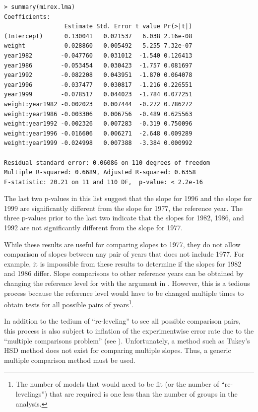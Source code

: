 \documentclass[10pt,openany]{book}\usepackage[]{graphicx}\usepackage[]{color}
\makeatletter
\newenvironment{kframe}{%
 \def\at@end@of@kframe{}%
 \ifinner\ifhmode%
  \def\at@end@of@kframe{\end{minipage}}%
  \begin{minipage}{\columnwidth}%
 \fi\fi%
 \def\FrameCommand##1{\hskip\@totalleftmargin \hskip-\fboxsep
 \colorbox{shadecolor}{##1}\hskip-\fboxsep
     \hskip-\linewidth \hskip-\@totalleftmargin \hskip\columnwidth}%
 \MakeFramed {\advance\hsize-\width
   \@totalleftmargin\z@ \linewidth\hsize
   \@setminipage}}%
 {\par\unskip\endMakeFramed%
 \at@end@of@kframe}
\newenvironment{knitrout}{}{} %
\makeatother
\begin{document}
\begin{knitrout}
\color{fgcolor}\begin{kframe}
\begin{verbatim}
> summary(mirex.lma)
Coefficients:
                 Estimate Std. Error t value Pr(>|t|)
(Intercept)      0.130041   0.021537   6.038 2.16e-08
weight           0.028860   0.005492   5.255 7.32e-07
year1982        -0.047760   0.031012  -1.540 0.126413
year1986        -0.053454   0.030423  -1.757 0.081697
year1992        -0.082208   0.043951  -1.870 0.064078
year1996        -0.037477   0.030817  -1.216 0.226551
year1999        -0.078517   0.044023  -1.784 0.077251
weight:year1982 -0.002023   0.007444  -0.272 0.786272
weight:year1986 -0.003306   0.006756  -0.489 0.625563
weight:year1992 -0.002326   0.007283  -0.319 0.750096
weight:year1996 -0.016606   0.006271  -2.648 0.009289
weight:year1999 -0.024998   0.007388  -3.384 0.000992

Residual standard error: 0.06086 on 110 degrees of freedom
Multiple R-squared: 0.6689,	Adjusted R-squared: 0.6358 
F-statistic: 20.21 on 11 and 110 DF,  p-value: < 2.2e-16 
\end{verbatim}
\end{kframe}
\end{knitrout}

The last two p-values in this list suggest that the slope for 1996 and the slope for 1999 are significantly different from the slope for 1977, the reference year.  The three p-values prior to the last two indicate that the slopes for 1982, 1986, and 1992 are not significantly different from the slope for 1977.

While these results are useful for comparing slopes to 1977, they do not allow comparison of slopes between any pair of years that does not include 1977.  For example, it is impossible from these results to determine if the slopes for 1982 and 1986 differ.  Slope comparisons to other reference years can be obtained by changing the reference level for  with the  argument in .  However, this is a tedious process because the reference level would have to be changed multiple times to obtain tests for all possible pairs of years\footnote{The number of models that would need to be fit (or the number of ``re-levelings'') that are required is one less than the number of groups in the analysis.}.

In addition to the tedium of ``re-leveling'' to see all possible comparison pairs, this process is also subject to inflation of the experimentwise error rate due to the ``multiple comparisons problem'' (see ).  Unfortunately, a method such as Tukey's HSD method does not exist for comparing multiple slopes.  Thus, a generic multiple comparison method must be used.
\end{document}
